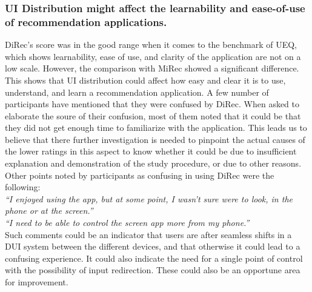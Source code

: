 \subsubsection{UI Distribution might affect the learnability and ease-of-use of recommendation applications.}
DiRec's score was in the good range when it comes to the benchmark of UEQ, which
shows learnability, ease of use, and clarity of the application are not on a low
scale. However, the comparison with MiRec showed a significant difference. This
shows that UI distribution could affect how easy and clear it is to use,
understand, and learn a recommendation application. A few number of participants
have mentioned that they were confused by DiRec. When asked to elaborate the
soure of their confusion, most of them noted that it could be that they did not
get enough time to familiarize with the application. This leads us to believe
that there further investigation is needed to pinpoint the actual causes of the
lower ratings in this aspect to know whether it could be due to insufficient
explanation and demonstration of the study procedure, or due to other reasons.
Other points noted by participants as confusing in using DiRec were the
following:\\
\textit{``I enjoyed using the app, but at some point, I wasn't sure were to look,
in the phone or at the screen.''}\\ 
\textit{``I need to be able to control the screen app more from my phone.''}\\
Such comments could be an indicator that users are after seamless shifts in a
DUI system between the different devices, and that otherwise it could lead to a
confusing experience. It could also indicate the need for a single point of
control with the possibility of input redirection. These could also be an opportune area for improvement.

